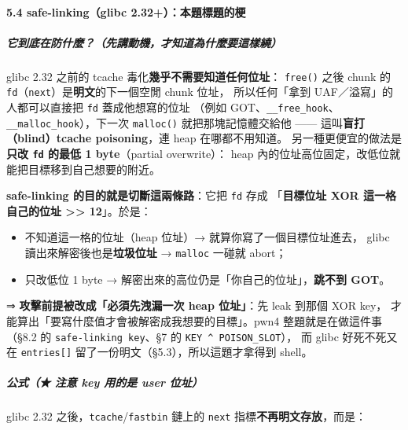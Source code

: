 \documentclass[10pt,a4paper]{article}
\providecommand{\tightlist}{%
  \setlength{\itemsep}{0pt}\setlength{\parskip}{0pt}}
\begin{document}
\paragraph{5.4 safe-linking（glibc
2.32+）：本題標題的梗}\label{safe-linkingglibc-2.32ux672cux984cux6a19ux984cux7684ux6897}

\subparagraph{它到底在防什麼？（先講動機，才知道為什麼要這樣繞）}\label{ux5b83ux5230ux5e95ux5728ux9632ux4ec0ux9ebcux5148ux8b1bux52d5ux6a5fux624dux77e5ux9053ux70baux4ec0ux9ebcux8981ux9019ux6a23ux7e5e}

glibc 2.32 之前的 tcache 毒化\textbf{幾乎不需要知道任何位址}：
\texttt{free()} 之後 chunk 的
\texttt{fd}（\texttt{next}）是\textbf{明文}的下一個空閒 chunk 位址，
所以任何「拿到 UAF／溢寫」的人都可以直接把 \texttt{fd} 蓋成他想寫的位址
（例如 GOT、\texttt{\_\allowbreak{}\_\allowbreak{}free\_\allowbreak{}hook}、\texttt{\_\allowbreak{}\_\allowbreak{}malloc\_\allowbreak{}hook}），下一次
\texttt{malloc()} 就把那塊記憶體交給他 ------
這叫\textbf{盲打（blind）tcache poisoning}，連 heap 在哪都不用知道。
另一種更便宜的做法是\textbf{只改 \texttt{fd} 的最低 1 byte}（partial
overwrite）： heap
內的位址高位固定，改低位就能把目標移到自己想要的附近。

\textbf{safe-linking 的目的就是切斷這兩條路}：它把 \texttt{fd} 存成
「\textbf{目標位址 XOR 這一格自己的位址 \textgreater\textgreater{}
12}」。於是：

\begin{itemize}
\tightlist
\item
  不知道這一格的位址（heap 位址）→ 就算你寫了一個目標位址進去， glibc
  讀出來解密後也是\textbf{垃圾位址} → \texttt{malloc} 一碰就 abort；
\item
  只改低位 1 byte → 解密出來的高位仍是「你自己的位址」，\textbf{跳不到
  GOT}。
\end{itemize}

⇒ \textbf{攻擊前提被改成「必須先洩漏一次 heap 位址」}：先 leak 到那個
XOR key， 才能算出「要寫什麼值才會被解密成我想要的目標」。pwn4
整題就是在做這件事 （§8.2 的 \texttt{safe-\allowbreak{}linking\ \allowbreak{}key}、§7 的
\texttt{KEY\ \allowbreak{}\^\allowbreak{}{}\allowbreak{}\ \allowbreak{}POISON\_\allowbreak{}SLOT}）， 而 glibc 好死不死又在
\texttt{entries{[}{]}} 留了一份明文（§5.3），所以這題才拿得到 shell。

\subparagraph{\texorpdfstring{公式（★ 注意 key 用的是 \textbf{user
位址}）}{公式（★ 注意 key 用的是 user 位址）}}\label{ux516cux5f0f-ux6ce8ux610f-key-ux7528ux7684ux662f-user-ux4f4dux5740}

glibc 2.32 之後，\texttt{tcache}/\texttt{fastbin} 鏈上的 \texttt{next}
指標\textbf{不再明文存放}，而是：
\end{document}
